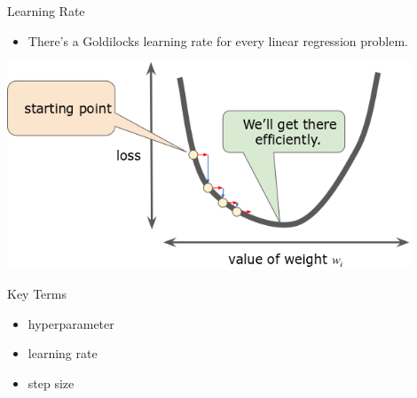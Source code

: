 \documentclass{beamer}
\begin{document}

\begin{frame}{Learning Rate}
\begin{itemize}
\item There's a Goldilocks learning rate for every linear regression problem.
\end{itemize}
\includegraphics[width=0.9\textwidth]{images/LearningRateJustRight.png}
\end{frame}


\begin{frame}{Key Terms}
\begin{itemize}
\item hyperparameter
\item learning rate
\item step size
\end{itemize}
\end{frame}
\end{document}

